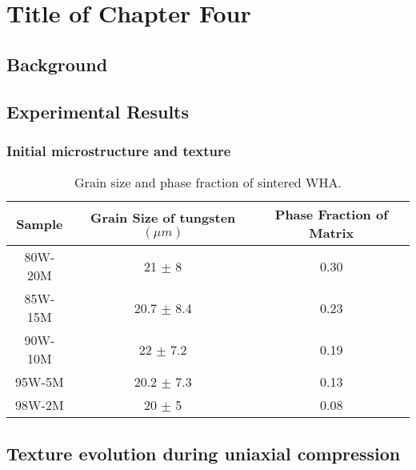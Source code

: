 
\chapter{Title of Chapter Four}

\label{Chapter4}


\section{Background}

\lipsum[2-4]

\section{Experimental Results}
\subsection{Initial microstructure and texture}

\lipsum[2-4]

\begin{table}
    \centering
        \begin{tabular}{ccc}
        \hline 
        Sample & Grain Size of tungsten $(\mu m)$ & Phase Fraction of Matrix \\
        \hline
         80W-20M & 21 $\pm$ 8 & 0.30 \\
         85W-15M & 20.7 $\pm$ 8.4 & 0.23 \\
         90W-10M & 22 $\pm$ 7.2 & 0.19 \\
         95W-5M & 20.2 $\pm$ 7.3 & 0.13 \\
         98W-2M & 20 $\pm$ 5 & 0.08 \\
        \hline
        \end{tabular}
    \caption{Grain size and phase fraction of sintered WHA.}
    \label{Table:grain_size_and_phase_fraction_of_sintered}
\end{table}

\lipsum[2-4]

\section{Texture evolution during uniaxial compression}
\label{Texture evolution during uniaxial compression}

\lipsum[2-4]

